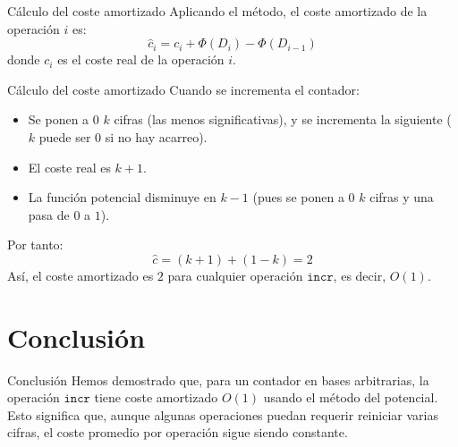 \documentclass[aspectratio=169]{beamer}
\begin{document}
\begin{frame}{Cálculo del coste amortizado}
    Aplicando el método, el coste amortizado de la operación $i$ es:
    \[
    \hat{c}_i = c_i + \Phi(D_i) - \Phi(D_{i-1})
    \]
    donde $c_i$ es el coste real de la operación $i$.
\end{frame}

\begin{frame}{Cálculo del coste amortizado}
    Cuando se incrementa el contador:
    \begin{itemize}
        \item Se ponen a $0$ $k$ cifras (las menos significativas), y se incrementa la siguiente ($k$ puede ser $0$ si no hay acarreo).
        \item El coste real es $k+1$.
        \item La función potencial disminuye en $k-1$ (pues se ponen a $0$ $k$ cifras y una pasa de $0$ a $1$).
    \end{itemize}
    Por tanto:
    \[
    \hat{c} = (k+1) + (1-k) = 2
    \]
    Así, el coste amortizado es $2$ para cualquier operación $\texttt{incr}$, es decir, $O(1)$.
\end{frame}


\section{Conclusión}
\begin{frame}{Conclusión}
    Hemos demostrado que, para un contador en bases arbitrarias, la operación $\texttt{incr}$ tiene coste amortizado $O(1)$ usando el método del potencial. Esto significa que, aunque algunas operaciones puedan requerir reiniciar varias cifras, el coste promedio por operación sigue siendo constante.
\end{frame}
\end{document}

